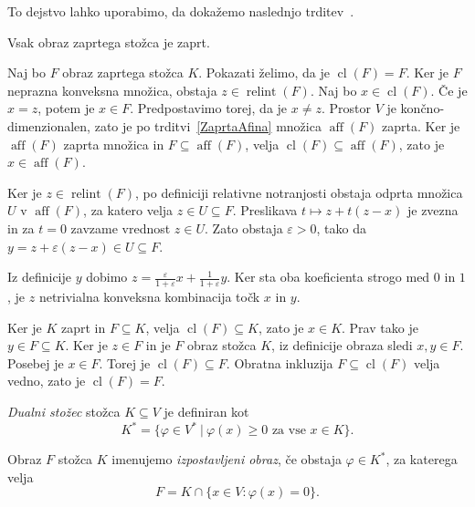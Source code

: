 \documentclass[mat2, tisk]{fmfdelo}
\begin{document}
To dejstvo lahko uporabimo, da dokažemo naslednjo trditev~\cite[trditev 18.1, posledica 18.1.1]{rockafellar}.
\begin{trditev}\label{trditev2.15}
  Vsak obraz zaprtega stožca je zaprt.
\end{trditev}
\begin{dokaz}
  Naj bo $F$ obraz zaprtega stožca $K$. Pokazati želimo, da je
  $\operatorname{cl}(F)=F$. Ker je $F$ neprazna konveksna množica,
  obstaja $z\in\operatorname{relint}(F)$.
  Naj bo $x\in\operatorname{cl}(F)$. Če je $x=z$, potem je $x\in F$.
  Predpostavimo torej, da je $x\neq z$.
  Prostor $V$ je končno-dimenzionalen, zato je po trditvi~\ref{ZaprtaAfina} množica
  $\operatorname{aff}(F)$ zaprta. Ker je $\operatorname{aff}(F)$ zaprta množica in
  $F\subseteq\operatorname{aff}(F)$, velja
  $\operatorname{cl}(F)\subseteq\operatorname{aff}(F)$, zato je
  $x\in\operatorname{aff}(F)$.

  Ker je $z\in\operatorname{relint}(F)$, po definiciji relativne notranjosti obstaja odprta
  množica $U$ v $\operatorname{aff}(F)$, za katero velja
  $z\in U\subseteq F$. Preslikava
  $t\mapsto z+t(z-x)$ je zvezna in za $t=0$ zavzame vrednost $z\in U$.
  Zato obstaja $\varepsilon>0$, tako da
  $y=z+\varepsilon(z-x)\in U\subseteq F$.

  Iz definicije $y$ dobimo
  $z=\frac{\varepsilon}{1+\varepsilon}x+
  \frac{1}{1+\varepsilon}y$.
  Ker sta oba koeficienta strogo med $0$ in $1$, je $z$ netrivialna
  konveksna kombinacija točk $x$ in $y$.

  Ker je $K$ zaprt in $F\subseteq K$, velja
  $\operatorname{cl}(F)\subseteq K$, zato je $x\in K$. Prav tako je
  $y\in F\subseteq K$. Ker je $z\in F$ in je $F$ obraz stožca $K$,
  iz definicije obraza sledi $x,y\in F$. Posebej je $x\in F$.
  Torej je $\operatorname{cl}(F)\subseteq F$. Obratna inkluzija
  $F\subseteq\operatorname{cl}(F)$ velja vedno, zato je
  $\operatorname{cl}(F)=F$.
\end{dokaz}

\begin{definicija}
  \emph{Dualni stožec} stožca $K \subseteq V$ je definiran kot
  \[
  K^{*} = \{ \varphi \in V^{*}~|~\varphi(x) \ge 0 \text{ za vse } x \in K \}.
  \]
\end{definicija}

\begin{definicija}
  Obraz $F$ stožca $K$ imenujemo \emph{izpostavljeni obraz}, če obstaja $\varphi \in K^*$, 
za katerega velja
\[F = K \cap \{ x \in V : \varphi(x) = 0 \}.\]
\end{definicija}
\end{document}
